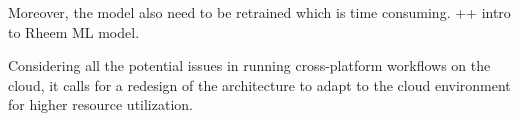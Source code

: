 Moreover, the model also need to be retrained which is time consuming. ++ intro to Rheem ML model.





Considering all the potential issues in running cross-platform workflows on the cloud, it calls for a redesign of the architecture to adapt to the cloud environment for higher resource utilization.
